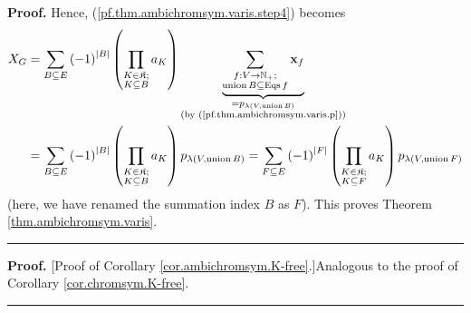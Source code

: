 \documentclass[numbers=enddot,12pt,final,onecolumn,notitlepage]{scrartcl}%
\theoremstyle{definition}
\newenvironment{proof}[1][Proof]{\noindent\textbf{#1.} }{\ \rule{0.5em}{0.5em}}
\newenvironment{verlong}{}{}
\newenvironment{vershort}{}{}
\let\sumnonlimits\sum
\let\prodnonlimits\prod
\renewcommand{\sum}{\sumnonlimits\limits}
\renewcommand{\prod}{\prodnonlimits\limits}
\begin{document}
\begin{verlong}
\begin{proof}
Hence, (\ref{pf.thm.ambichromsym.varis.step4}) becomes%
\begin{align*}
X_{G}  &  =\sum_{B\subseteq E}\left(  -1\right)  ^{\left\vert B\right\vert
}\left(  \prod_{\substack{K\in\mathfrak{K};\\K\subseteq B}}a_{K}\right)
\underbrace{\sum_{\substack{f:V\rightarrow\mathbb{N}_{+}%
;\\\operatorname*{union}B\subseteq\operatorname*{Eqs}f}}\mathbf{x}_{f}%
}_{\substack{=p_{\lambda\left(  V,\operatorname*{union}B\right)  }\\\text{(by
(\ref{pf.thm.ambichromsym.varis.p}))}}}\\
&  =\sum_{B\subseteq E}\left(  -1\right)  ^{\left\vert B\right\vert }\left(
\prod_{\substack{K\in\mathfrak{K};\\K\subseteq B}}a_{K}\right)  p_{\lambda
\left(  V,\operatorname*{union}B\right)  }=\sum_{F\subseteq E}\left(
-1\right)  ^{\left\vert F\right\vert }\left(  \prod_{\substack{K\in
\mathfrak{K};\\K\subseteq F}}a_{K}\right)  p_{\lambda\left(
V,\operatorname*{union}F\right)  }%
\end{align*}
(here, we have renamed the summation index $B$ as $F$). This proves Theorem
\ref{thm.ambichromsym.varis}.
\end{proof}
\end{verlong}

\begin{vershort}
\begin{proof}
[Proof of Corollary \ref{cor.ambichromsym.K-free}.]Analogous to the proof of
Corollary \ref{cor.chromsym.K-free}.
\end{proof}
\end{vershort}
\end{document}
